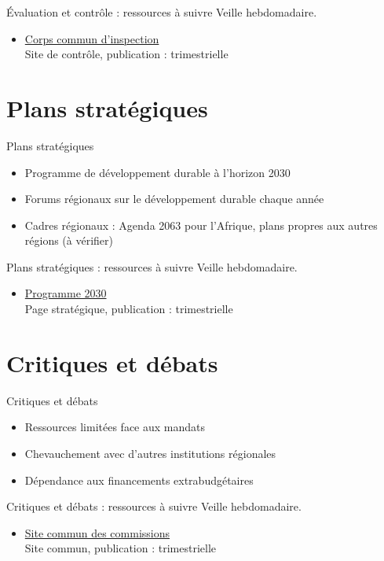 \documentclass[aspectratio=169,11pt]{beamer}
\begin{document}
\begin{frame}{Évaluation et contrôle : ressources à suivre}
\small
Veille hebdomadaire.
\begin{itemize}
\item \href{https://www.unjiu.org}{Corps commun d'inspection}\\{\footnotesize Site de contrôle, publication : trimestrielle}
\end{itemize}
\end{frame}

\section{Plans stratégiques}
\begin{frame}{Plans stratégiques}
\begin{itemize}
\item Programme de développement durable à l'horizon 2030
\item Forums régionaux sur le développement durable chaque année
\item Cadres régionaux : Agenda 2063 pour l'Afrique, plans propres aux autres régions (à vérifier)
\end{itemize}
\end{frame}

\begin{frame}{Plans stratégiques : ressources à suivre}
\small
Veille hebdomadaire.
\begin{itemize}
\item \href{https://sdgs.un.org/2030agenda}{Programme 2030}\\{\footnotesize Page stratégique, publication : trimestrielle}
\end{itemize}
\end{frame}

\section{Critiques et débats}
\begin{frame}{Critiques et débats}
\begin{itemize}
\item Ressources limitées face aux mandats
\item Chevauchement avec d'autres institutions régionales
\item Dépendance aux financements extrabudgétaires
\end{itemize}
\end{frame}

\begin{frame}{Critiques et débats : ressources à suivre}
\small
Veille hebdomadaire.
\begin{itemize}
\item \href{https://www.regionalcommissions.org}{Site commun des commissions}\\{\footnotesize Site commun, publication : trimestrielle}
\end{itemize}
\end{frame}
\end{document}
